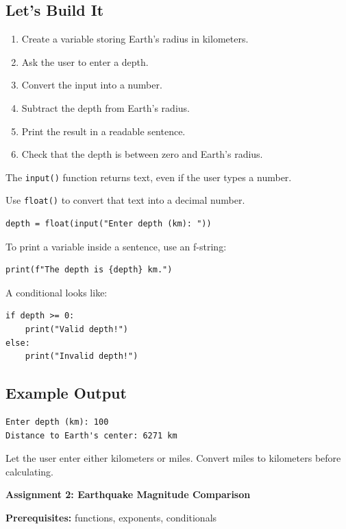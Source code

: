 \documentclass[11pt,letterpaper]{article}
\newcommand{\assignment}[3]{
    \clearpage
    {\Large\bfseries\color{navy} Assignment #1: #2}

    \vspace{2mm}
    {\small\color{darkgray}\textbf{Prerequisites:} #3}

    \vspace{3mm}
}
\newcommand{\steps}{\subsection*{Let's Build It}}
\newcommand{\exampleoutput}{\subsection*{Example Output}}
\begin{document}
\steps

\begin{enumerate}
    \item Create a variable storing Earth's radius in kilometers.
    \item Ask the user to enter a depth.
    \item Convert the input into a number.
    \item Subtract the depth from Earth's radius.
    \item Print the result in a readable sentence.
    \item Check that the depth is between zero and Earth's radius.
\end{enumerate}

\begin{hintbox}
The \texttt{input()} function returns text, even if the user types a number.

Use \texttt{float()} to convert that text into a decimal number.

\begin{lstlisting}
depth = float(input("Enter depth (km): "))
\end{lstlisting}

To print a variable inside a sentence, use
an f-string:

\begin{lstlisting}
print(f"The depth is {depth} km.")
\end{lstlisting}

A conditional looks like:

\begin{lstlisting}
if depth >= 0:
    print("Valid depth!")
else:
    print("Invalid depth!")
\end{lstlisting}
\end{hintbox}

\exampleoutput

\begin{lstlisting}[style=outputstyle]
Enter depth (km): 100
Distance to Earth's center: 6271 km
\end{lstlisting}

\begin{challengebox}
Let the user enter either kilometers or miles.
Convert miles to kilometers before calculating.
\end{challengebox}

\assignment{2}{Earthquake Magnitude Comparison}
{functions, exponents, conditionals}
\end{document}
